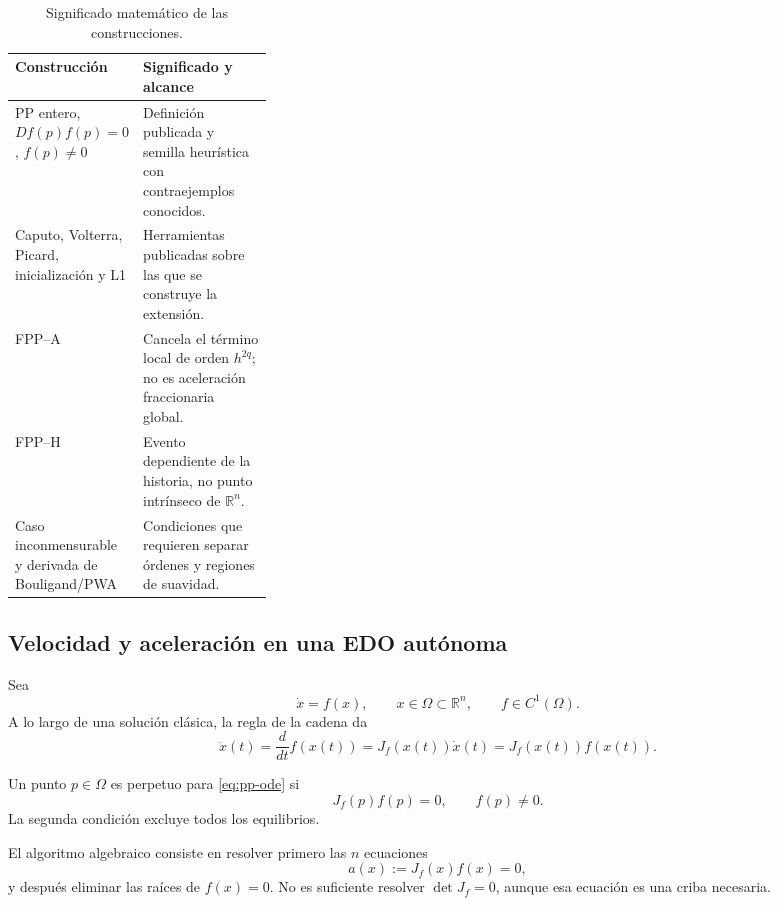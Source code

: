 \begin{table}[H]
\centering
\caption{Significado matemático de las construcciones.}
\label{tab:pp-status-map}
\small
\begin{tabularx}{\linewidth}{@{}L{0.30\linewidth}Y@{}}
\toprule
Construcción & Significado y alcance \\
\midrule
PP entero, \(Df(p)f(p)=0\), \(f(p)\ne0\) & Definición publicada y semilla
heurística con contraejemplos conocidos. \\
Caputo, Volterra, Picard, inicialización y L1 & Herramientas publicadas sobre
las que se construye la extensión. \\
FPP--A & Cancela el término local de orden
\(h^{2q}\); no es aceleración fraccionaria global. \\
FPP--H & Evento dependiente de la historia, no punto
intrínseco de \(\mathbb R^n\). \\
Caso inconmensurable y derivada de Bouligand/PWA & Condiciones que requieren
separar órdenes y regiones de suavidad. \\
\bottomrule
\end{tabularx}
\end{table}

\subsection{Velocidad y aceleración en una EDO autónoma}

Sea
\begin{equation}
 \dot x=f(x),\qquad x\in\Omega\subset\mathbb R^n,\qquad f\in C^1(\Omega).
 \label{eq:pp-ode}
\end{equation}
A lo largo de una solución clásica, la regla de la cadena da
\begin{equation}
 \ddot x(t)=\frac{d}{dt}f(x(t))
 =J_f(x(t))\dot x(t)=J_f(x(t))f(x(t)).
 \label{eq:pp-acceleration}
\end{equation}

\begin{definition}
Un punto \(p\in\Omega\) es perpetuo para \cref{eq:pp-ode} si
\begin{equation}
 J_f(p)f(p)=0,
 \qquad f(p)\neq0.
 \label{eq:pp-definition}
\end{equation}
La segunda condición excluye todos los equilibrios.
\end{definition}

El algoritmo algebraico consiste en resolver primero las \(n\) ecuaciones
\begin{equation}
 a(x):=J_f(x)f(x)=0,
 \label{eq:pp-algebraic-system}
\end{equation}
y después eliminar las raíces de \(f(x)=0\). No es suficiente resolver
\(\det J_f=0\), aunque esa ecuación es una criba necesaria.

